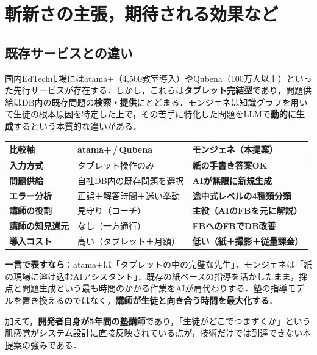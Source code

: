 \documentclass[paper=a4,fontsize=10.5bp,jafontsize=10.5bp,twocolumn]{jlreq}
\begin{document}
\section{斬新さの主張，期待される効果など}

\subsection{既存サービスとの違い}

国内EdTech市場にはatama+（4,500教室導入）やQubena（100万人以上）といった先行サービスが存在する．しかし，これらは\textbf{タブレット完結型}であり，問題供給はDB内の既存問題の\textbf{検索・提供}にとどまる．モンジェネは知識グラフを用いて生徒の根本原因を特定した上で，その苦手に特化した問題をLLMで\textbf{動的に生成}するという本質的な違いがある．

\begin{scriptsize}\noindent
\begin{tabularx}{\linewidth}{>{\bfseries}l X X}
\toprule
比較軸 & atama+\,/\,Qubena & モンジェネ（本提案） \\
\midrule
入力方式 & タブレット操作のみ & \textbf{紙の手書き答案OK} \\
問題供給 & 自社DB内の既存問題を選択 & \textbf{AIが無限に新規生成} \\
エラー分析 & 正誤＋解答時間＋迷い挙動 & \textbf{途中式レベルの4種類分類} \\
講師の役割 & 見守り（コーチ） & \textbf{主役（AIのFBを元に解説）} \\
講師の知見還元 & なし（一方通行） & \textbf{FBへのFBでDB改善} \\
導入コスト & 高い（タブレット＋月額） & \textbf{低い（紙＋撮影＋従量課金）} \\
\bottomrule
\end{tabularx}
\end{scriptsize}

\begin{highlightbox}
\textbf{一言で表すなら}：atama+は「タブレットの中の完璧な先生」，モンジェネは「紙の現場に溶け込むAIアシスタント」．既存の紙ベースの指導を活かしたまま，採点と問題生成という最も時間のかかる作業をAIが肩代わりする．塾の指導モデルを置き換えるのではなく，\textbf{講師が生徒と向き合う時間を最大化する}．
\end{highlightbox}

\noindent
加えて，\textbf{開発者自身が5年間の塾講師}であり，「生徒がどこでつまずくか」という肌感覚がシステム設計に直接反映されている点が，技術だけでは到達できない本提案の強みである．
\end{document}
